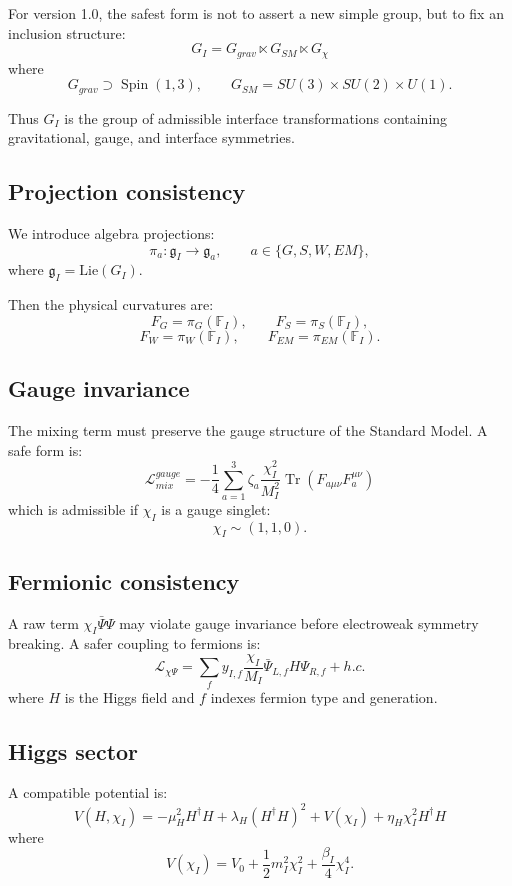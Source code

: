 \documentclass[12pt,a4paper]{article}
\DeclareMathOperator{\Spin}{Spin}
\DeclareMathOperator{\Tr}{Tr}
\begin{document}
For version 1.0, the safest form is not to assert a new simple group, but to fix an inclusion structure:
\[
\boxed{G_I=G_{grav}\ltimes G_{SM}\ltimes G_{\chi}}
\]
where
\[
G_{grav}\supset\Spin(1,3),\qquad G_{SM}=SU(3)\times SU(2)\times U(1).
\]

Thus $G_I$ is the group of admissible interface transformations containing gravitational, gauge, and interface symmetries.

\subsection{Projection consistency}

We introduce algebra projections:
\[
\boxed{\pi_a:\mathfrak g_I\to\mathfrak g_a,\qquad a\in\{G,S,W,EM\}},
\]
where $\mathfrak g_I=\mathrm{Lie}(G_I)$.

Then the physical curvatures are:
\[
\boxed{F_G=\pi_G(\mathbb F_I)},\qquad
\boxed{F_S=\pi_S(\mathbb F_I)},
\]
\[
\boxed{F_W=\pi_W(\mathbb F_I)},\qquad
\boxed{F_{EM}=\pi_{EM}(\mathbb F_I)}.
\]

\subsection{Gauge invariance}

The mixing term must preserve the gauge structure of the Standard Model. A safe form is:
\[
\boxed{
\mathcal L_{mix}^{gauge}
=-\frac14\sum_{a=1}^{3}\zeta_a\frac{\chi_I^2}{M_I^2}\Tr(F_{a\mu\nu}F_a^{\mu\nu})
}
\]
which is admissible if $\chi_I$ is a gauge singlet:
\[
\boxed{\chi_I\sim(1,1,0)}.
\]

\subsection{Fermionic consistency}

A raw term $\chi_I\bar\Psi\Psi$ may violate gauge invariance before electroweak symmetry breaking. A safer coupling to fermions is:
\[
\boxed{
\mathcal L_{\chi\Psi}
=
\sum_f y_{I,f}\frac{\chi_I}{M_I}\bar\Psi_{L,f}H\Psi_{R,f}+h.c.
}
\]
where $H$ is the Higgs field and $f$ indexes fermion type and generation.

\subsection{Higgs sector}

A compatible potential is:
\[
\boxed{
V(H,\chi_I)=
-\mu_H^2H^\dagger H+
\lambda_H(H^\dagger H)^2+
V(\chi_I)+
\eta_H\chi_I^2H^\dagger H
}
\]
where
\[
\boxed{V(\chi_I)=V_0+\frac12m_I^2\chi_I^2+\frac{\beta_I}{4}\chi_I^4}.
\]
\end{document}
